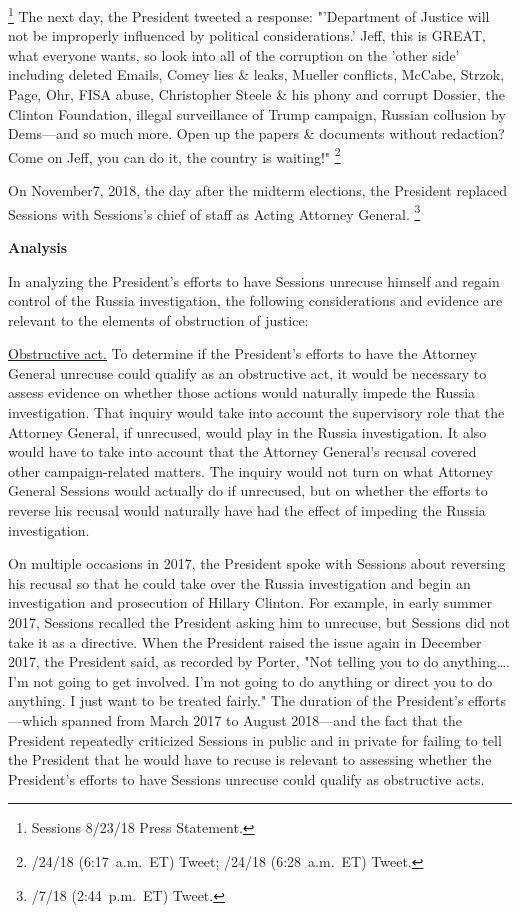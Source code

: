 {\footnote{Sessions 8/23/18 Press Statement.}
The next day, the President tweeted a response: "'Department of Justice will not be improperly influenced by political considerations.'
Jeff, this is GREAT, what everyone wants, so look into all of the corruption on the 'other side' including deleted Emails, Comey lies \& leaks, Mueller conflicts, McCabe, Strzok, Page, Ohr, FISA abuse, Christopher Steele \& his phony and corrupt Dossier, the Clinton Foundation, illegal surveillance of Trump campaign, Russian collusion by Dems---and so much more.
Open up the papers \& documents without redaction? Come on Jeff, you can do it, the country is waiting!"%
\footnote{/24/18 (6:17~a.m.~ET) Tweet;
/24/18 (6:28~a.m.~ET) Tweet.}

On November7, 2018, the day after the midterm elections, the President replaced Sessions with Sessions's chief of staff as Acting Attorney General.%
\footnote{/7/18 (2:44~p.m.~ET) Tweet.}

\begin{center}
\textbf{Analysis}
\end{center}

In analyzing the President's efforts to have Sessions unrecuse himself and regain control of the Russia investigation, the following considerations and evidence are relevant to the elements of obstruction of justice:

\underline{Obstructive act.}
To determine if the President's efforts to have the Attorney General unrecuse could qualify as an obstructive act, it would be necessary to assess evidence on whether those actions would naturally impede the Russia investigation.
That inquiry would take into account the supervisory role that the Attorney General, if unrecused, would play in the Russia investigation.
It also would have to take into account that the Attorney General's recusal covered other campaign-related matters.
The inquiry would not turn on what Attorney General Sessions would actually do if unrecused, but on whether the efforts to reverse his recusal would naturally have had the effect of impeding the Russia investigation.

On multiple occasions in 2017, the President spoke with Sessions about reversing his recusal so that he could take over the Russia investigation and begin an investigation and prosecution of Hillary Clinton.
For example, in early summer 2017, Sessions recalled the President asking him to unrecuse, but Sessions did not take it as a directive.
When the President raised the issue again in December 2017, the President said, as recorded by Porter, "Not telling you to do anything\dots.
I'm not going to get involved.
I'm not going to do anything or direct you to do anything.
I just want to be treated fairly."
The duration of the President's efforts---which spanned from March 2017 to August 2018---and the fact that the President repeatedly criticized Sessions in public and in private for failing to tell the President that he would have to recuse is relevant to assessing whether the President's efforts to have Sessions unrecuse could qualify as obstructive acts.

}
